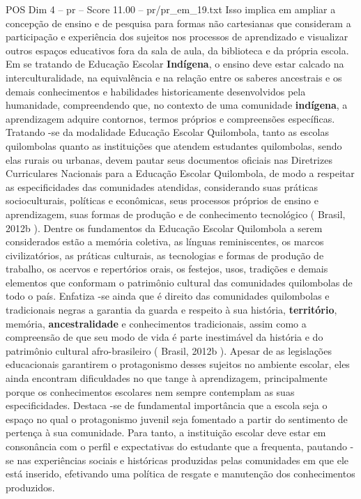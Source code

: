 \begin{textsample}{POS Dim 4 – pr – Score 11.00 – pr/pr\_em\_19.txt}  \label{ex:f4_pos_186}
Isso implica em ampliar a concepção de ensino e de pesquisa para formas não cartesianas que consideram a participação e experiência dos sujeitos nos processos de aprendizado e visualizar outros espaços educativos fora da sala de aula, da biblioteca e da própria escola.
Em se tratando de Educação Escolar \textbf{Indígena}, o ensino deve estar calcado na interculturalidade, na equivalência e na relação entre os saberes ancestrais e os demais conhecimentos e habilidades historicamente desenvolvidos pela humanidade, compreendendo que, no contexto de uma comunidade \textbf{indígena}, a aprendizagem adquire contornos, termos próprios e compreensões específicas.
Tratando -se da modalidade Educação Escolar Quilombola, tanto as escolas quilombolas quanto as instituições que atendem estudantes quilombolas, sendo elas rurais ou urbanas, devem pautar seus documentos oficiais nas Diretrizes Curriculares Nacionais para a Educação Escolar Quilombola, de modo a respeitar as especificidades das comunidades atendidas, considerando suas práticas socioculturais, políticas e econômicas, seus processos próprios de ensino e aprendizagem, suas formas de produção e de conhecimento tecnológico ( Brasil, 2012b ).
Dentre os fundamentos da Educação Escolar Quilombola a serem considerados estão a memória coletiva, as línguas reminiscentes, os marcos civilizatórios, as práticas culturais, as tecnologias e formas de produção de trabalho, os acervos e repertórios orais, os festejos, usos, tradições e demais elementos que conformam o patrimônio cultural das comunidades quilombolas de todo o país.
Enfatiza -se ainda que é direito das comunidades quilombolas e tradicionais negras a garantia da guarda e respeito à sua história, \textbf{território}, memória, \textbf{ancestralidade} e conhecimentos tradicionais, assim como a compreensão de que seu modo de vida é parte inestimável da história e do patrimônio cultural afro-brasileiro ( Brasil, 2012b ).
Apesar de as legislações educacionais garantirem o protagonismo desses sujeitos no ambiente escolar, eles ainda encontram dificuldades no que tange à aprendizagem, principalmente porque os conhecimentos escolares nem sempre contemplam as suas especificidades.
Destaca -se de fundamental importância que a escola seja o espaço no qual o protagonismo juvenil seja fomentado a partir do sentimento de pertença à sua comunidade.
Para tanto, a instituição escolar deve estar em consonância com o perfil e expectativas do estudante que a frequenta, pautando -se nas experiências sociais e históricas produzidas pelas comunidades em que ele está inserido, efetivando uma política de resgate e manutenção dos conhecimentos produzidos.

\end{textsample}
